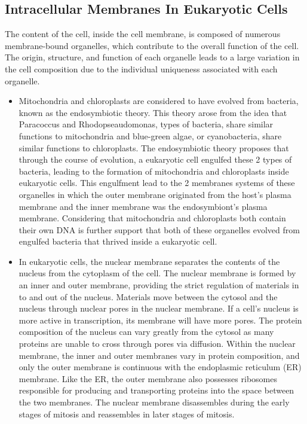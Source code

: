 \hypertarget{intracellular-membranes-in-eukaryotic-cells}{%
\subsection{Intracellular Membranes In Eukaryotic Cells}\label{intracellular-membranes-in-eukaryotic-cells}}

The content of the cell, inside the cell membrane, is composed of numerous membrane-bound organelles, which contribute to the overall function of the cell. The origin, structure, and function of each organelle leads to a large variation in the cell composition due to the individual uniqueness associated with each organelle.

\begin{itemize}
\tightlist
\item
  Mitochondria and chloroplasts are considered to have evolved from bacteria, known as the endosymbiotic theory. This theory arose from the idea that Paracoccus and Rhodopseaudomonas, types of bacteria, share similar functions to mitochondria and blue-green algae, or cyanobacteria, share similar functions to chloroplasts. The endosymbiotic theory proposes that through the course of evolution, a eukaryotic cell engulfed these 2 types of bacteria, leading to the formation of mitochondria and chloroplasts inside eukaryotic cells. This engulfment lead to the 2 membranes systems of these organelles in which the outer membrane originated from the host's plasma membrane and the inner membrane was the endosymbiont's plasma membrane. Considering that mitochondria and chloroplasts both contain their own DNA is further support that both of these organelles evolved from engulfed bacteria that thrived inside a eukaryotic cell.
\item
  In eukaryotic cells, the nuclear membrane separates the contents of the nucleus from the cytoplasm of the cell. The nuclear membrane is formed by an inner and outer membrane, providing the strict regulation of materials in to and out of the nucleus. Materials move between the cytosol and the nucleus through nuclear pores in the nuclear membrane. If a cell's nucleus is more active in transcription, its membrane will have more pores. The protein composition of the nucleus can vary greatly from the cytosol as many proteins are unable to cross through pores via diffusion. Within the nuclear membrane, the inner and outer membranes vary in protein composition, and only the outer membrane is continuous with the endoplasmic reticulum (ER) membrane. Like the ER, the outer membrane also possesses ribosomes responsible for producing and transporting proteins into the space between the two membranes. The nuclear membrane disassembles during the early stages of mitosis and reassembles in later stages of mitosis.

\end{itemize}

